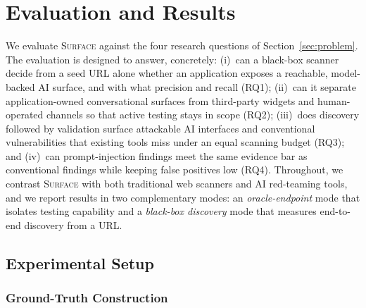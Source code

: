 %

\section{Evaluation and Results}
\label{sec:eval}

We evaluate \textsc{Surface} against the four research questions of
Section~\ref{sec:problem}. The evaluation is designed to answer, concretely:
(i)~can a black-box scanner decide from a seed URL alone whether an
application exposes a reachable, model-backed AI surface, and with what
precision and recall (RQ1); (ii)~can it separate application-owned
conversational surfaces from third-party widgets and human-operated channels
so that active testing stays in scope (RQ2); (iii)~does discovery followed by
validation surface attackable AI interfaces and conventional vulnerabilities
that existing tools miss under an equal scanning budget (RQ3); and (iv)~can
prompt-injection findings meet the same evidence bar as conventional findings
while keeping false positives low (RQ4). Throughout, we contrast
\textsc{Surface} with both traditional web scanners and AI red-teaming tools,
and we report results in two complementary modes: an \emph{oracle-endpoint}
mode that isolates testing capability and a \emph{black-box discovery} mode
that measures end-to-end discovery from a URL.

\subsection{Experimental Setup}
\label{sec:eval:setup}

\subsubsection{Ground-Truth Construction}
\label{sec:eval:gt}

